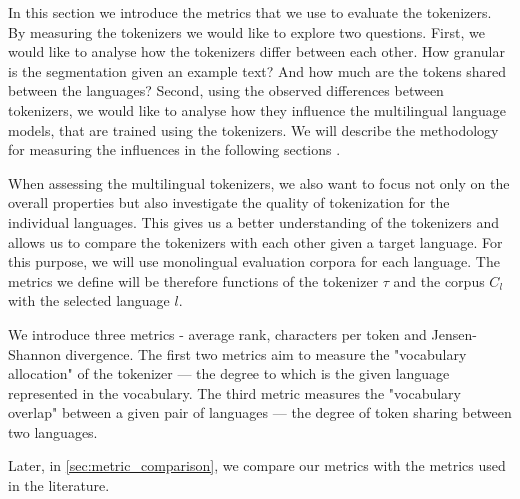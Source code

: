 

In this section we introduce the metrics that we use to evaluate the tokenizers. By measuring the tokenizers we would like to explore two questions. First, we would like to analyse how the tokenizers differ between each other. How granular is the segmentation given an example text? And how much are the tokens shared between the languages? Second, using the observed differences between tokenizers, we would like to analyse how they influence the multilingual language models, that are trained using the tokenizers. We will describe the methodology for measuring the influences in the following sections .

When assessing the multilingual tokenizers, we also want to focus not only on the overall properties but also investigate the quality of tokenization for the individual languages. This gives us a better understanding of the tokenizers and allows us to compare the tokenizers with each other given a target language. For this purpose, we will use monolingual evaluation corpora for each language. The metrics we define will be therefore functions of the tokenizer $\tau$ and the corpus $C_l$ with the selected language $l$. 

We introduce three metrics - average rank, characters per token and Jensen-Shannon divergence. The first two metrics aim to measure the "vocabulary allocation" of the tokenizer --- the degree to which is the given language represented in the vocabulary. The third metric measures the "vocabulary overlap" between a given pair of languages --- the degree of token sharing between two languages.

Later, in \autoref{sec:metric_comparison}, we compare our metrics with the metrics used in the literature.

